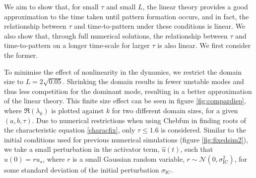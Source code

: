 We aim to show that, for small $\tau$ and small $L$, the linear theory provides a good approximation to the time taken until pattern formation occurs, and in fact, the relationship between $\tau$ and time-to-pattern under these conditions is linear. We also show that, through full numerical solutions, the relationship between $\tau$ and time-to-pattern on a longer time-scale for larger $\tau$ is also linear. We first consider the former.

To minimise the effect of nonlinearity in the dynamics, we restrict the domain size to $L=2\sqrt{0.05}$. Shrinking the domain results in fewer unstable modes and thus less competition for the dominant mode, resulting in a better approximation of the linear theory. This finite size effect can be seen in figure \ref{fig:compardisp}, where $\Re(\lambda_k)$ is plotted against $k$ for two different domain sizes, for a given $(a,b,\tau)$. Due to numerical restrictions when using Chebfun in finding roots of the characteristic equation \eqref{characfix}, only $\tau\leq1.6$ is considered. Similar to the initial conditions used for previous numerical simulations (figure \ref{fig:fixedsim2}), we take a small perturbation in the activator term, $\hat{u}(t)$, such that $\hat{u}(0)=ru_\star$, where $r$ is a small Gaussian random variable, $r\sim\mathcal{N}\left(0,\sigma_{\text{IC}}^2\right)$,
for some standard deviation of the initial perturbation $\sigma_{\text{IC}}$.

